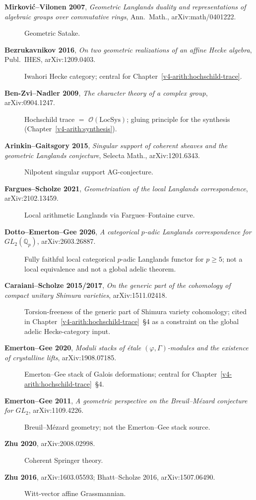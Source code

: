 \begin{description}
\item[\textbf{Mirkovi\'c--Vilonen 2007}, \emph{Geometric Langlands
duality and representations of algebraic groups over commutative
rings}, Ann.~Math., arXiv:math/0401222.] Geometric Satake.
\item[\textbf{Bezrukavnikov 2016}, \emph{On two geometric
realizations of an affine Hecke algebra}, Publ.~IHES,
arXiv:1209.0403.] Iwahori Hecke category; central for
Chapter~\ref{v4-arith:hochschild-trace}.
\item[\textbf{Ben-Zvi--Nadler 2009}, \emph{The character theory of
a complex group}, arXiv:0904.1247.] Hochschild trace \(=\)
\(\mathcal{O}(\mathrm{LocSys})\); gluing principle for the synthesis
(Chapter~\ref{v4-arith:synthesis}).
\item[\textbf{Arinkin--Gaitsgory 2015}, \emph{Singular support of
coherent sheaves and the geometric Langlands conjecture}, Selecta
Math., arXiv:1201.6343.] Nilpotent singular support AG-conjecture.
\item[\textbf{Fargues--Scholze 2021}, \emph{Geometrization of the
local Langlands correspondence}, arXiv:2102.13459.] Local
arithmetic Langlands via Fargues--Fontaine curve.
\item[\textbf{Dotto--Emerton--Gee 2026}, \emph{A categorical
\(p\)-adic Langlands correspondence for \(GL_{2}(\mathbb{Q}_{p})\)},
arXiv:2603.26887.] Fully faithful local categorical
\(p\)-adic Langlands functor for \(p\geq 5\); not a local equivalence
and not a global adelic theorem.
\item[\textbf{Caraiani--Scholze 2015/2017}, \emph{On the generic part of
the cohomology of compact unitary Shimura varieties},
arXiv:1511.02418.] Torsion-freeness of the generic part of Shimura
variety cohomology; cited in
Chapter~\ref{v4-arith:hochschild-trace}~\S4 as a constraint on the
global adelic Hecke-category input.
\item[\textbf{Emerton--Gee 2020}, \emph{Moduli stacks of \'etale
\((\varphi,\Gamma)\)-modules and the existence of crystalline lifts},
arXiv:1908.07185.] Emerton--Gee stack of Galois deformations; central for
Chapter~\ref{v4-arith:hochschild-trace}~\S4.
\item[\textbf{Emerton--Gee 2011}, \emph{A geometric perspective on
the Breuil--M\'ezard conjecture for \(GL_{2}\)}, arXiv:1109.4226.]
Breuil--M\'ezard geometry; not the Emerton--Gee stack source.
\item[\textbf{Zhu 2020}, arXiv:2008.02998.] Coherent Springer theory.
\item[\textbf{Zhu 2016}, arXiv:1603.05593; Bhatt--Scholze 2016,
arXiv:1507.06490.] Witt-vector affine Grassmannian.
\end{description}

